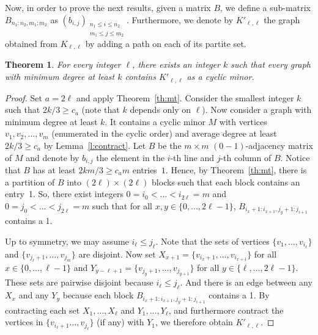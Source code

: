 \documentclass[11pt]{article}
\newtheorem{theo}{Theorem}[section]
\begin{document}
Now, in order to prove the next results, given a matrix $B$, we define a sub-matrix $B_{n_1:n_2,m_1:m_2}$ as $(b_{i,j})_{\begin{smallmatrix}n_1\leq i\leq n_2 \\ m_1\leq j\leq m_2\end{smallmatrix}}$. Furthermore, we denote by $K'_{\ell,\ell}$ the graph obtained from $K_{\ell,\ell}$ by adding a path on each of its partite set.

\begin{theo} 
 For every integer $\ell$, there exists an integer $k$ such that every graph with minimum degree at least $k$ contains $K'_{\ell, \ell}$ as a cyclic minor.
 \end{theo}

\begin{proof}
  Set $a= 2\ell$ and apply Theorem~\ref{th:mt}. Consider the smallest integer $k$ such that $2k/3 \geq c_a$ (note that $k$ depends only on $\ell$). Now consider a graph with minimum degree at least $k$. It contains a cyclic minor $M$ with vertices $v_1,v_2,\dots, v_m$ (enumerated in the cyclic order) and average degree at least $2k/3 \geq c_a$ by Lemma~\ref{l:contract}. Let $B$ be the $m\times m$ $(0-1)$-adjacency matrix of $M$ and denote by $b_{i,j}$ the element in the $i$-th line and $j$-th column of $B$. Notice that $B$ has at least $2km/3 \geq c_a m$ entries~$1$. Hence, by Theorem~\ref{th:mt}, there is a partition of $B$ into $(2\ell)\times(2\ell)$ blocks such that each block contains an entry~1. 
  So, there exist integers $0 = i_0 < \dots < i_{2\ell} = m$ and $0 = j_0 < \dots < j_{2\ell} = m$ such that for all $x, y \in \{ 0, \dots, 2\ell-1\}$, $B_{i_x+1:i_{x+1},j_y+1:j_{i+1}}$ contains a 1. 
  
  Up to symmetry, we may assume $i_\ell \leq j_\ell$. 
  Note that the sets of vertices $\{v_1, \dots, v_{i_\ell}\}$ and $\{v_{j_\ell+1}, \dots, v_{j_m}\}$ are disjoint. Now set $X_{x+1} = \{v_{i_x+1}, \dots, v_{i_{x+1}}\}$ for all $x\in \{0, \dots, \ell-1\}$ and  $Y_{y-\ell+1} = \{v_{j_y+1}, \dots, v_{j_{y+1}}\}$ for all $y\in \{\ell, \dots, 2\ell-1\}$.  These sets are pairwise disjoint because $i_\ell \leq j_\ell$.  And there is an edge between any $X_x$ and any $Y_y$ because each block $B_{i_x+1:i_{x+1},j_y+1:j_{i+1}}$ contains a 1.
  By contracting each  set $X_1, \dots, X_\ell$ and $Y_1, \dots, Y_\ell$, and  furthermore contract the vertices in $\{v_{i_\ell+1} \dots, v_{j_\ell}\}$ (if any) with $Y_1$, we therefore obtain $K'_{\ell, \ell}$. 
\end{proof}
\end{document}
